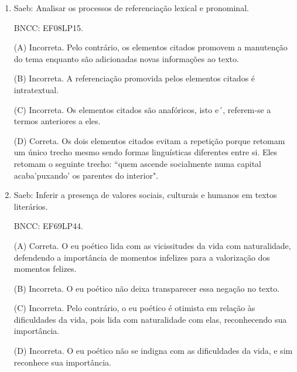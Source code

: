 \begin{enumerate}
(B) Incorreta. As nuvens são, pelo contrário, multiformes e, quando
menos se espera, já assumiram outro formato ou sumiram. Portanto, não é
esse o motivo da comparação.

(C) Correta. O eu lírico compara as nuvens aos seus sonhos porque,
segundo ele, estes são passageiros, assim como as nuvens são
transitórias.

(D) Incorreta. As nuvens podem ser reconhecíveis, mas isso não é algo
referido no poema. O eu lírico, ao contrário, não reconhece seus sonhos
porque são passageiros.


\item

Saeb: Analisar os processos de referenciação lexical e pronominal.

BNCC: EF08LP15.

(A) Incorreta. Pelo contrário, os elementos citados promovem a
manutenção do tema enquanto são adicionadas novas informações ao texto.

(B) Incorreta. A referenciação promovida pelos elementos citados é
intratextual.

(C) Incorreta. Os elementos citados são anafóricos, isto e´, referem-se
a termos anteriores a eles.

(D) Correta. Os dois elementos citados evitam a repetição porque retomam
um único trecho mesmo sendo formas linguísticas diferentes entre si.
Eles retomam o seguinte trecho: ``quem ascende socialmente numa capital
acaba'puxando' os parentes do interior".

\item


Saeb: Inferir a presença de valores sociais, culturais e humanos em
textos literários.

BNCC: EF69LP44.

(A) Correta. O eu poético lida com as vicissitudes da vida com
naturalidade, defendendo a importância de momentos infelizes para a
valorização dos momentos felizes.

(B) Incorreta. O eu poético não deixa transparecer essa negação no texto.


(C) Incorreta. Pelo contrário, o eu poético é otimista em relação às
dificuldades da vida, pois lida com naturalidade com elas, reconhecendo
sua importância.

(D) Incorreta. O eu poético não se indigna com as dificuldades da vida,
e sim reconhece sua importância.

\end{enumerate}
